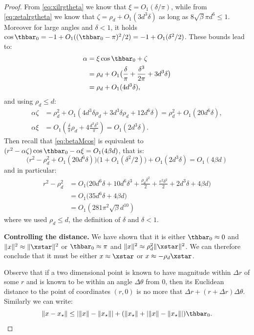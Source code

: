 \begin{proof}
	\noindent 
	From \eqref{eq:xilrgtheta} we know that $\xi = O_1(\delta/\pi)$, while from \eqref{eq:zetalrgtheta} we know that $\zeta = \rho_d +O_1(3 d^3 \delta)$ as long as $8 \sqrt{\beta} \pi d^6 \leq 1$. Moreover for large angles 
	and $\delta < 1$, it holds $\cos \thbar_0 = -1 + O_1((\thbar_0 - \pi)^2/2) = -1 + O_1(\delta^2/2)$. These bounds lead to:
	\[
	\begin{aligned}
	\alpha &= \xi \cos \thbar_0 + \zeta \\
	&= \rho_d + O_1\big( \frac{\delta}{\pi} + \frac{\delta^3}{2 \pi} + 3 d^3 \delta \big)\\
	&= \rho_d + O_1(4 d^3 \delta),
	\end{aligned}
	\]
	and using $\rho_d \leq d$:
	\[
	\begin{aligned}
	\alpha \zeta &= \rho_d^2 + O_1(4 d^3 \delta \rho_d + 3 d^3 \delta \rho_d + 12 d^6 \delta) = \rho_d^2 + O_1(20 d^6 \delta),\\
	\alpha \xi &= O_1(\frac{\delta}{\pi} \rho_d + 4 \frac{d^3 \delta^2}{\pi}) = O_1(2 d^3 \delta).
	\end{aligned}
	\] 
	Then recall that \eqref{eq:betaMcos} is equivalent to $(r^2 - \alpha \zeta) \cos \thbar_0 - \alpha \xi = O_1(4 \beta d)$, that is:
	\[
	\big(r^2 - \rho_d^2 + O_1(20 d^6 \delta) \big) \big(1 + O_1({\delta^2}/{2}) \big) + O_1(2 d^3 \delta) = O_1(4 \beta d)
	\]
	and in particular:
	\begin{equation}\label{eq:r2-rho2}
	\begin{aligned}
	r^2 -\rho_d^2 &= O_1 \Big( 20 d^6 \delta +10 d^6 \delta^3 + \frac{\rho_d \delta^2}{2} + \frac{r^2 \delta^2}{2}  +
	2 d^3 \delta + 4 \beta d \Big) \\
	&= O_1\big( 35 d^6 \delta + 4 \beta d\big) \\
	&= O_1(281 \pi^2 \sqrt{\beta} d^{10})
	\end{aligned}
	\end{equation}
	where we used $\rho_d \leq d$,  the definition of $\delta$ and $\delta < 1$.
	
	\medskip
	\noindent \textbf{Controlling the distance.} We have shown that it is either $\thbar_0 \approx 0$ and $\|x\|^2 \approx \|\xstar\|^2$
	or $\thbar_0 \approx \pi$ and $\|x\|^2 \approx \rho_d^2 \| \xstar \|^2$. We can therefore conclude that 
	it must be either $x \approx \xstar$ or $x \approx -\rho_d \xstar$. 
	
	Observe that if a two dimensional point is known to have magnitude within $\Delta r$ of 
	some $r$ and is known to be within an angle $\Delta \theta$ from 0, then its Euclidean distance to the point of coordinates $(r,0)$ is no more that $\Delta r + (r + \Delta r)\Delta \theta$. Similarly we can write:
	\begin{equation}\label{eq:x1-x2}
	\| x - x_\star \| \leq |\|x\| - \|x_\star \| | + (\|x_\star \| + |\|x\| - \|x_\star \||) \thbar_0.
	\end{equation}
	

\end{proof}
